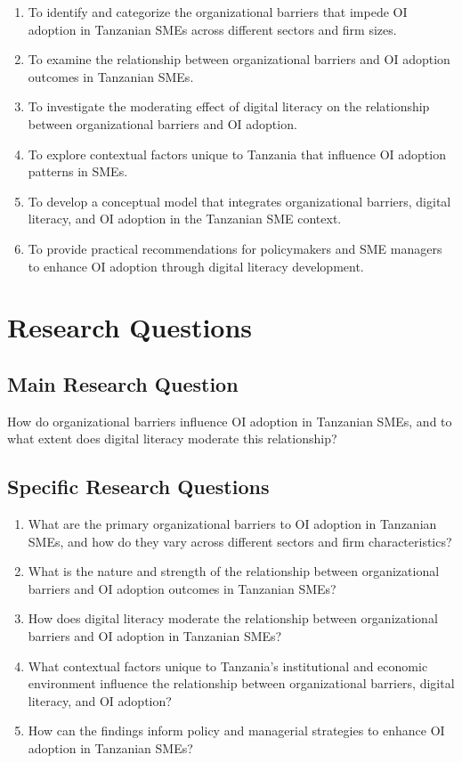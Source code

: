 \begin{enumerate}
    \item To identify and categorize the organizational barriers that impede OI adoption in Tanzanian SMEs across different sectors and firm sizes.
    \item To examine the relationship between organizational barriers and OI adoption outcomes in Tanzanian SMEs.
    \item To investigate the moderating effect of digital literacy on the relationship between organizational barriers and OI adoption.
    \item To explore contextual factors unique to Tanzania that influence OI adoption patterns in SMEs.
    \item To develop a conceptual model that integrates organizational barriers, digital literacy, and OI adoption in the Tanzanian SME context.
    \item To provide practical recommendations for policymakers and SME managers to enhance OI adoption through digital literacy development.
\end{enumerate}

\section{Research Questions}

\subsection{Main Research Question}

How do organizational barriers influence OI adoption in Tanzanian SMEs, and to what extent does digital literacy moderate this relationship?

\subsection{Specific Research Questions}

\begin{enumerate}
    \item What are the primary organizational barriers to OI adoption in Tanzanian SMEs, and how do they vary across different sectors and firm characteristics?
    \item What is the nature and strength of the relationship between organizational barriers and OI adoption outcomes in Tanzanian SMEs?
    \item How does digital literacy moderate the relationship between organizational barriers and OI adoption in Tanzanian SMEs?
    \item What contextual factors unique to Tanzania's institutional and economic environment influence the relationship between organizational barriers, digital literacy, and OI adoption?
    \item How can the findings inform policy and managerial strategies to enhance OI adoption in Tanzanian SMEs?
\end{enumerate}

